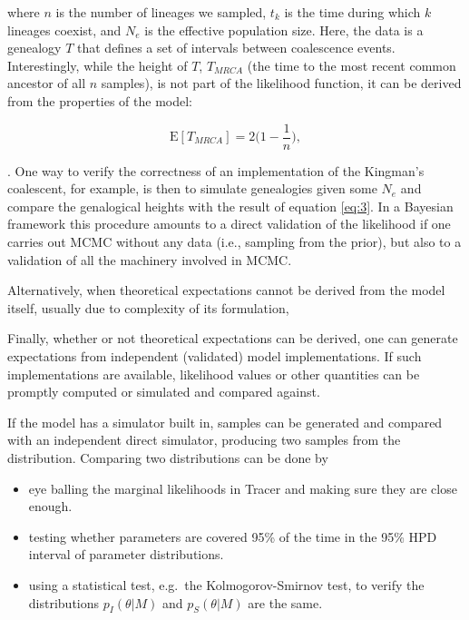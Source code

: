 \documentclass[oneside]{article}
\begin{document}
\noindent where $n$ is the number of lineages we sampled, $t_k$ is the time during which $k$ lineages
coexist, and $N_e$ is the effective population size.
Here, the data is a genealogy $T$ that defines a set of intervals
between coalescence events.
Interestingly, while the height of $T$, $T_{MRCA}$ (the time to the most
recent common ancestor of all $n$ samples), is not part of the
likelihood function, it can be derived from the properties of the
model:

\begin{equation}
  \text{E}[T_{MRCA}] = 2 \bigg(1-\frac{1}{n}\bigg),
  \label{eq:3}
\end{equation}

\noindent \citep{hudson90}.
One way to verify the correctness of an implementation of the Kingman's
coalescent, for example, is then to simulate genealogies given some
$N_e$ and compare the genalogical heights with the result of equation
\ref{eq:3}.
In a Bayesian framework this procedure amounts to a direct validation of the
likelihood if one carries out MCMC without any data (i.e., sampling
from the prior), but also to a validation of all the machinery involved in MCMC.

Alternatively, when theoretical expectations cannot be derived from
the model itself, usually due to complexity of its formulation, {\color{red}{[Place holder for Christiaan's text]}}

Finally, whether or not theoretical expectations can be
derived, one can generate expectations from independent (validated) model implementations.
If such implementations are available, likelihood values or other
quantities can be promptly computed or simulated and compared against.








If the model has a simulator built in, samples can be generated and compared with an 
independent direct simulator, producing two samples from the distribution. Comparing 
two distributions can be done by

\begin{itemize}
\item
  eye balling the marginal likelihoods in Tracer and making sure they
  are close enough.
\item
  testing whether parameters are covered 95\% of the time in the 95\%
  HPD interval of parameter distributions.
\item
  using a statistical test, e.g.~the Kolmogorov-Smirnov test, to verify
  the distributions \(p_I(\theta|M)\) and \(p_S(\theta|M)\) are the
  same.
\end{itemize}
\end{document}
